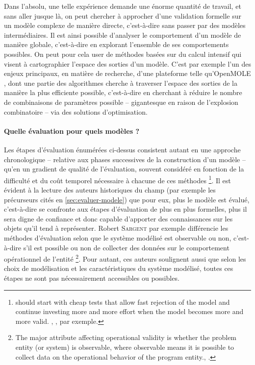 Dans l'absolu, une telle expérience demande une énorme quantité de travail, et sans aller jusque là, on peut chercher à approcher d'une validation formelle sur un modèle complexe de manière directe, c'est-à-dire sans passer par des modèles intermédiaires.
Il est ainsi possible d'analyser le comportement d'un modèle de manière globale, c'est-à-dire en explorant l'ensemble de ses comportements possibles.
On peut pour cela user de méthodes basées sur du calcul intensif qui visent à cartographier \og l'espace des sorties\fg{} d'un modèle.
C'est par exemple l'un des enjeux principaux, en matière de recherche, d'une plateforme telle qu'OpenMOLE \autocite{reuillon_openmole_2013}, dont une partie des algorithmes \autocite[par exemple][]{cherel_beyond_2015} cherche à traverser l'espace des sorties de la manière la plus efficiente possible, c'est-à-dire en cherchant à réduire le nombre de combinaisons de paramètres possible -- gigantesque en raison de l'explosion combinatoire -- via des solutions d'optimisation.

\paragraph{Quelle évaluation pour quels modèles ?}\label{par:quelle-eval-quel-modeles}

Les étapes d'évaluation énumérées ci-dessus consistent autant en une approche chronologique -- relative aux phases successives de la construction d'un modèle -- qu'en un gradient de qualité de l'évaluation, souvent considéré en fonction de la difficulté et du coût temporel nécessaire à chacune de ces méthodes
\footnote{
	\og [One] should start with cheap tests that allow fast rejection of the model and continue investing more and more effort when the model becomes more and more valid. \fg{}, \textcite[42]{klugl_validation_2008}, par exemple.
}.
Il est évident à la lecture des auteurs historiques du champ (par exemple les précurseurs cités en \cref{sec:evaluer-modele}) que pour eux, \og plus\fg{} le modèle est évalué, c'est-à-dire se confronte aux étapes d'évaluation de plus en plus formelles, plus il sera digne de confiance et donc capable d'apporter des connaissances sur les objets qu'il tend à représenter.
Robert \textsc{Sargent} par exemple différencie les méthodes d'évaluation selon que le système modélisé est observable ou non, c'est-à-dire \og s'il est possible ou non de collecter des données sur le comportement opérationnel de l'entité \fg{}
\footnote{
	\og The major attribute affecting operational validity is whether the problem entity (or system) is observable, where observable means it is possible to collect data on the operational behavior of the program entity.\fg{}, \textcite[6]{sargent2009verification}.
}.
Pour autant, ces auteurs soulignent aussi que selon les choix de modélisation et les caractéristiques du système modélisé, toutes ces étapes ne sont pas nécessairement accessibles ou possibles.

